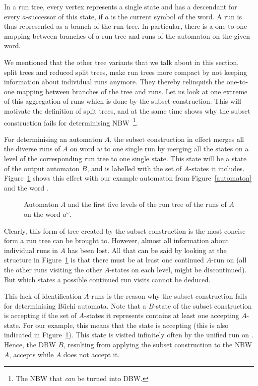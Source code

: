 In a run tree, every vertex represents a single state and has a descendant for every $a$-successor of this state, if $a$ is the current symbol of the word. A run is thus represented as a branch of the run tree. In particular, there is a one-to-one mapping between branches of a run tree and runs of the automaton on the given word.

We mentioned that the other tree variants that we talk about in this section,  split trees and reduced split trees, make run trees more compact by not keeping information about individual runs anymore. They thereby relinquish the one-to-one mapping between branches of the tree and runs. Let us look at one extreme of this aggregation of runs which is done by the subset construction. This will motivate the definition of split trees, and at the same time shows why the subset construction fails for determinising NBW~\footnote{The NBW that \emph{can} be turned into DBW.}.

For determinising an automaton $A$, the subset construction in effect merges all the diverse runs of $A$ on word $w$ to one single run by merging all the states on a level of the corresponding run tree to one single state. This state will be a state of the output automaton $B$, and is labelled with the set of $A$-states it includes. Figure~\ref{subset_construction_tree} shows this effect with our example automaton from Figure~\ref{automaton} and the word \aom. 

\begin{figure}
\centering
\SubsetConstructionTree
\caption{Automaton $A$ and the first five levels of the run tree of the runs of $A$ on the word $a^\omega$.}
\label{subset_construction_tree}
\end{figure}

Clearly, this form of tree created by the subset construction is the most concise form a run tree can be brought to. However, almost all information about individual runs in $A$ has been lost. All that can be said by looking at the structure in Figure~\ref{subset_construction_tree} is that there must be at least one continued $A$-run on \aom (all the other runs visiting the other $A$-states on each level, might be discontinued). But which states a possible continued run visits cannot be deduced.

This lack of identification $A$-runs is the reason why the subset construction fails for determinising Büchi automata. Note that a $B$-state of the subset construction is accepting if the set of $A$-states it represents contains at least one accepting $A$-state. For our example, this means that the state  is accepting (this is also indicated in Figure~\ref{subset_construction_tree}). This state is visited infinitely often by the unified run on \aom. Hence, the DBW $B$, resulting from applying the subset construction to the NBW $A$, accepts \aom while $A$ does not accept it.

